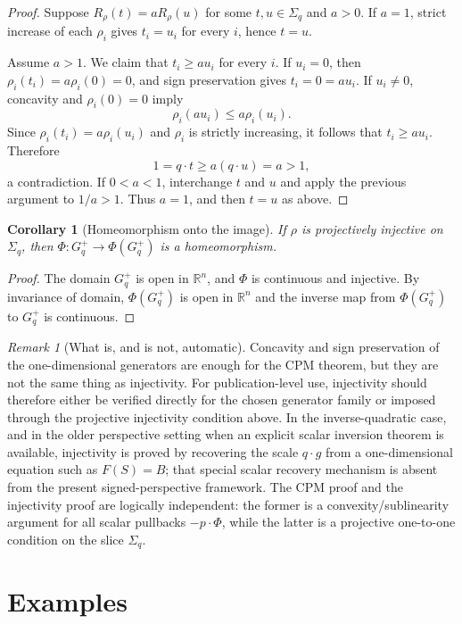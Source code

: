 \documentclass[11pt]{article}
\theoremstyle{plain}
\newtheorem{corollary}[theorem]{Corollary}
\theoremstyle{definition}
\theoremstyle{remark}
\newtheorem{remark}[theorem]{Remark}
\newcommand{\R}{\mathbb{R}}
\begin{document}
\begin{proof}
Suppose $R_\rho(t)=aR_\rho(u)$ for some $t,u\in\Sigma_q$ and $a>0$. If $a=1$, strict increase of each $\rho_i$ gives $t_i=u_i$ for every $i$, hence $t=u$.

Assume $a>1$. We claim that $t_i\ge a u_i$ for every $i$. If $u_i=0$, then $\rho_i(t_i)=a\rho_i(0)=0$, and sign preservation gives $t_i=0=a u_i$. If $u_i\ne0$, concavity and $\rho_i(0)=0$ imply
\[
\rho_i(a u_i)\le a\rho_i(u_i).
\]
Since $\rho_i(t_i)=a\rho_i(u_i)$ and $\rho_i$ is strictly increasing, it follows that $t_i\ge a u_i$. Therefore
\[
1=q\cdot t\ge a(q\cdot u)=a>1,
\]
a contradiction. If $0<a<1$, interchange $t$ and $u$ and apply the previous argument to $1/a>1$. Thus $a=1$, and then $t=u$ as above.
\end{proof}

\begin{corollary}[Homeomorphism onto the image]
If $\rho$ is projectively injective on $\Sigma_q$, then $\Phi:G_q^+\to\Phi(G_q^+)$ is a homeomorphism.
\end{corollary}

\begin{proof}
The domain $G_q^+$ is open in $\R^n$, and $\Phi$ is continuous and injective. By invariance of domain, $\Phi(G_q^+)$ is open in $\R^n$ and the inverse map from $\Phi(G_q^+)$ to $G_q^+$ is continuous.
\end{proof}

\begin{remark}[What is, and is not, automatic]
Concavity and sign preservation of the one-dimensional generators are enough for the CPM theorem, but they are not the same thing as injectivity. For publication-level use, injectivity should therefore either be verified directly for the chosen generator family or imposed through the projective injectivity condition above. In the inverse-quadratic case, and in the older perspective setting when an explicit scalar inversion theorem is available, injectivity is proved by recovering the scale $q\cdot g$ from a one-dimensional equation such as $F(S)=B$; that special scalar recovery mechanism is absent from the present signed-perspective framework. The CPM proof and the injectivity proof are logically independent: the former is a convexity/sublinearity argument for all scalar pullbacks $-p\cdot\Phi$, while the latter is a projective one-to-one condition on the slice $\Sigma_q$.
\end{remark}

\section{Examples}
\end{document}
